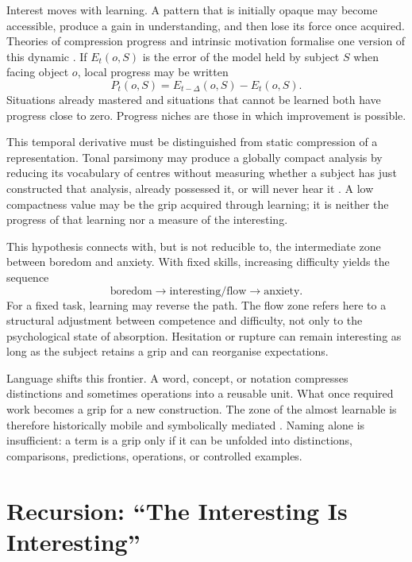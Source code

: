 \documentclass[11pt,a4paper]{article}
\begin{document}
Interest moves with learning. A pattern that is initially opaque may become
accessible, produce a gain in understanding, and then lose its force once
acquired. Theories of compression progress and intrinsic motivation formalise
one version of this dynamic
\parencite{schmidhuber1997interesting,schmidhuber2009compression,oudeyer2007intrinsic,oudeyer2007typology}.
If \(E_t(o,S)\) is the error of the model held by subject \(S\) when facing
object \(o\), local progress may be written
\[
  P_t(o,S)=E_{t-\Delta}(o,S)-E_t(o,S).
\]
Situations already mastered and situations that cannot be learned both have
progress close to zero. Progress niches are those in which improvement is
possible.

This temporal derivative must be distinguished from static compression of a
representation. Tonal parsimony may produce a globally compact analysis by
reducing its vocabulary of centres without measuring whether a subject has just
constructed that analysis, already possessed it, or will never hear it
\parencite{pachet2026tonalparsimony}. A low compactness value may be the grip
acquired through learning; it is neither the progress of that learning nor a
measure of the interesting.

This hypothesis connects with, but is not reducible to, the intermediate zone
between boredom and anxiety. With fixed skills, increasing difficulty yields
the sequence
\[
  \text{boredom}\longrightarrow\text{interesting/flow}
  \longrightarrow\text{anxiety}.
\]
For a fixed task, learning may reverse the path. The flow zone refers here to a
structural adjustment between competence and difficulty, not only to the
psychological state of absorption. Hesitation or rupture can remain interesting
as long as the subject retains a grip and can reorganise expectations.

Language shifts this frontier. A word, concept, or notation compresses
distinctions and sometimes operations into a reusable unit. What once required
work becomes a grip for a new construction. The zone of the almost learnable is
therefore historically mobile and symbolically mediated
\parencite{vygotsky1978mind,lenat1991thresholds,lenat2008turtle,koestler1989act,steels2005coordinating,steels2015talkingheads}.
Naming alone is insufficient: a term is a grip only if it can be unfolded into
distinctions, comparisons, predictions, operations, or controlled examples.

\section{Recursion: ``The Interesting Is Interesting''}
\end{document}
